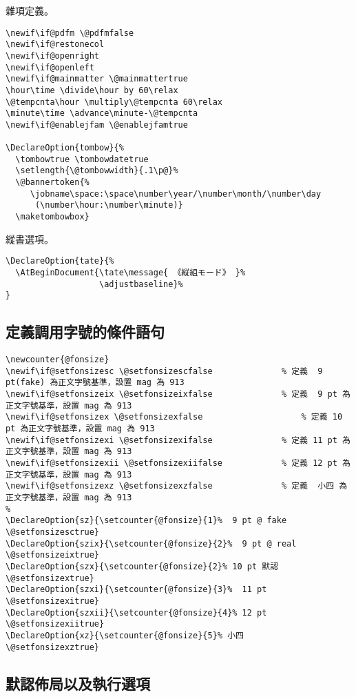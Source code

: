 \clearpage
\par 雜項定義。
\begin{lstlisting}[firstnumber=67]
\newif\if@pdfm \@pdfmfalse
\newif\if@restonecol
\newif\if@openright
\newif\if@openleft
\newif\if@mainmatter \@mainmattertrue
\hour\time \divide\hour by 60\relax
\@tempcnta\hour \multiply\@tempcnta 60\relax
\minute\time \advance\minute-\@tempcnta
\newif\if@enablejfam \@enablejfamtrue

\DeclareOption{tombow}{%
  \tombowtrue \tombowdatetrue
  \setlength{\@tombowwidth}{.1\p@}%
  \@bannertoken{%
     \jobname\space:\space\number\year/\number\month/\number\day
      (\number\hour:\number\minute)}
  \maketombowbox}
\end{lstlisting}

\par 縱書選項。
\begin{lstlisting}[firstnumber=84]
\DeclareOption{tate}{%
  \AtBeginDocument{\tate\message{ 《縦組モード》 }%
                   \adjustbaseline}%
}
\end{lstlisting}

\subsection{定義調用字號的條件語句}
\begin{lstlisting}[firstnumber=89]
\newcounter{@fonsize}
\newif\if@setfonsizesc \@setfonsizescfalse				% 定義  9 pt(fake) 為正文字號基準，設置 mag 為 913
\newif\if@setfonsizeix \@setfonsizeixfalse				% 定義  9 pt 為正文字號基準，設置 mag 為 913
\newif\if@setfonsizex \@setfonsizexfalse					% 定義 10 pt 為正文字號基準，設置 mag 為 913
\newif\if@setfonsizexi \@setfonsizexifalse				% 定義 11 pt 為正文字號基準，設置 mag 為 913
\newif\if@setfonsizexii \@setfonsizexiifalse			% 定義 12 pt 為正文字號基準，設置 mag 為 913
\newif\if@setfonsizexz \@setfonsizexzfalse				% 定義  小四 為正文字號基準，設置 mag 為 913
%
\DeclareOption{sz}{\setcounter{@fonsize}{1}%  9 pt @ fake
\@setfonsizesctrue}
\DeclareOption{szix}{\setcounter{@fonsize}{2}%  9 pt @ real
\@setfonsizeixtrue}
\DeclareOption{szx}{\setcounter{@fonsize}{2}% 10 pt 默認
\@setfonsizextrue}
\DeclareOption{szxi}{\setcounter{@fonsize}{3}%  11 pt
\@setfonsizexitrue}
\DeclareOption{szxii}{\setcounter{@fonsize}{4}% 12 pt
\@setfonsizexiitrue}
\DeclareOption{xz}{\setcounter{@fonsize}{5}% 小四
\@setfonsizexztrue}
\end{lstlisting}


\subsection{默認佈局以及執行選項}

